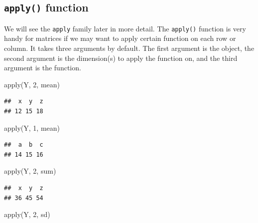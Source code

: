 \documentclass[
]{book}
\newenvironment{Shaded}{\begin{snugshade}}{\end{snugshade}}
\newcommand{\DecValTok}[1]{\textcolor[rgb]{0.00,0.00,0.81}{#1}}
\newcommand{\FunctionTok}[1]{\textcolor[rgb]{0.00,0.00,0.00}{#1}}
\newcommand{\NormalTok}[1]{#1}
\theoremstyle{definition}
\theoremstyle{definition}
\theoremstyle{definition}
\theoremstyle{definition}
\theoremstyle{remark}
\begin{document}
\hypertarget{apply-function}{%
\subsection{\texorpdfstring{\texttt{apply()} function}{apply() function}}\label{apply-function}}

We will see the \texttt{apply} family later in more detail. The \texttt{apply()} function is very handy for matrices if we may want to apply certain function on each row or column. It takes three arguments by default. The first argument is the object, the second argument is the dimension(s) to apply the function on, and the third argument is the function.

\begin{Shaded}
\begin{Highlighting}[]
\FunctionTok{apply}\NormalTok{(Y, }\DecValTok{2}\NormalTok{, mean)}
\end{Highlighting}
\end{Shaded}

\begin{verbatim}
##  x  y  z 
## 12 15 18
\end{verbatim}

\begin{Shaded}
\begin{Highlighting}[]
\FunctionTok{apply}\NormalTok{(Y, }\DecValTok{1}\NormalTok{, mean)}
\end{Highlighting}
\end{Shaded}

\begin{verbatim}
##  a  b  c 
## 14 15 16
\end{verbatim}

\begin{Shaded}
\begin{Highlighting}[]
\FunctionTok{apply}\NormalTok{(Y, }\DecValTok{2}\NormalTok{, sum)}
\end{Highlighting}
\end{Shaded}

\begin{verbatim}
##  x  y  z 
## 36 45 54
\end{verbatim}

\begin{Shaded}
\begin{Highlighting}[]
\FunctionTok{apply}\NormalTok{(Y, }\DecValTok{2}\NormalTok{, sd)}
\end{Highlighting}
\end{Shaded}
\end{document}
